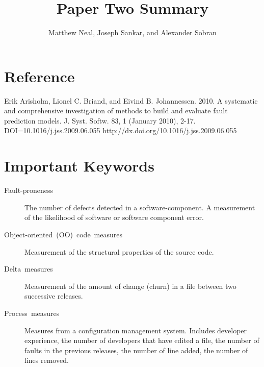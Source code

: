 \documentclass[english]{article}
\begin{document}
\title{Paper Two Summary}


\author{Matthew Neal, Joseph Sankar, and Alexander Sobran}

\maketitle

\section*{Reference}

Erik Arisholm, Lionel C. Briand, and Eivind B. Johannessen. 2010.
A systematic and comprehensive investigation of methods to build and
evaluate fault prediction models. J. Syst. Softw. 83, 1 (January 2010),
2-17. DOI=10.1016/j.jss.2009.06.055 http://dx.doi.org/10.1016/j.jss.2009.06.055


\section*{Important Keywords}
\begin{description}
\item [{Fault-proneness}] The number of defects detected in a software-component.
A measurement of the likelihood of software or software component
error. 
\item [{Object-oriented~(OO)~code~measures}] Measurement of the structural
properties of the source code. 
\item [{Delta~measures}] Measurement of the amount of change (churn) in
a file between two successive releases. 
\item [{Process~measures}] Measures from a configuration management system.
Includes developer experience, the number of developers that have
edited a file, the number of faults in the previous releases, the
number of line added, the number of lines removed.
\end{description}
\end{document}
